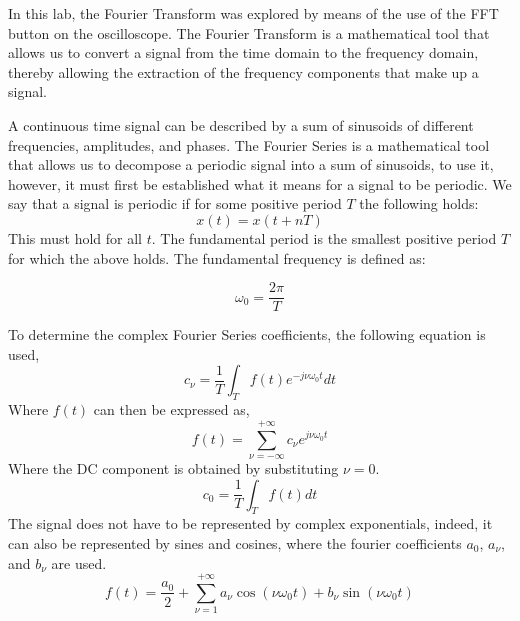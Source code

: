In this lab, the Fourier Transform was explored by means of the use of the FFT button on the oscilloscope. The Fourier Transform is a mathematical tool that allows us to convert a signal from the time domain to the frequency domain, thereby allowing the extraction of the frequency components that make up a signal.

A continuous time signal can be described by a sum of sinusoids of different frequencies, amplitudes, and phases. The Fourier Series is a mathematical tool that allows us to decompose a periodic signal into a sum of sinusoids, to use it, however, it must first be established what it means for a signal to be periodic.
We say that a signal is periodic if for some positive period $T$ the following holds:
\begin{equation}
    x(t) = x(t + nT)
\end{equation}
This must hold for all $t$. The fundamental period is the smallest positive period $T$ for which the above holds. The fundamental frequency is defined as:

\begin{equation}
    \omega_0 = \frac{2\pi}{T}
\end{equation}

To determine the complex Fourier Series coefficients, the following equation is used,
\begin{equation}
    c_\nu = \frac{1}{T}\int_{T}f(t)e^{-j\nu\omega_0t}dt
\end{equation}
Where $f(t)$ can then be expressed as,
\begin{equation}
    f(t) = \sum_{\nu=-\infty}^{+\infty}c_\nu e^{j\nu\omega_0t}
\end{equation}
Where the DC component is obtained by substituting $\nu = 0$.
\begin{equation}
    c_0 = \frac{1}{T}\int_{T}f(t)dt
\end{equation}
\newpage
The signal does not have to be represented by complex exponentials, indeed, it can also be represented by sines and cosines, where the fourier coefficients $a_0$, $a_\nu$, and $b_\nu$ are used.
\begin{equation}
    f(t) = \frac{a_0}{2} + \sum_{\nu=1}^{+\infty}a_\nu \cos(\nu\omega_0t) + b_\nu\sin(\nu\omega_0t)
\end{equation}

